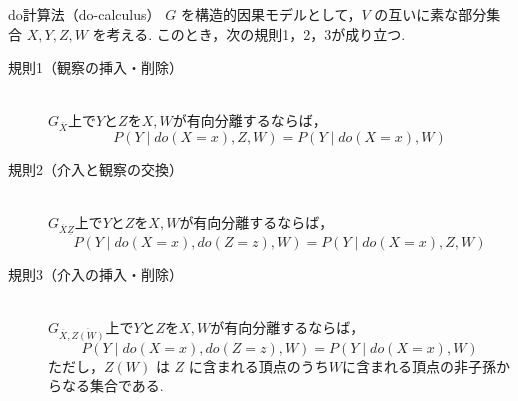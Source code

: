 \documentclass[uplatex, dvipdfmx]{jsarticle}
\begin{document}
\begin{thm}{do計算法（do-calculus）}
  $G$ を構造的因果モデルとして，$V$ の互いに素な部分集合 $X, Y, Z, W$ を考える.
  このとき，次の規則1，2，3が成り立つ.

  \begin{description}
    \item[規則1（観察の挿入・削除）] \hfill \\
      $G_{\overline{X}}$上で$Y$と$Z$を${X,W}$が有向分離するならば，
      \begin{equation}
        P(Y \mid do(X=x), Z, W) = P(Y \mid do(X=x), W)
      \end{equation}

    \item[規則2（介入と観察の交換）] \hfill \\
      $G_{\overline{X}\underline{Z}}$上で$Y$と$Z$を${X,W}$が有向分離するならば，
      \begin{equation}
        P(Y \mid do(X=x), do(Z=z), W) = P(Y \mid do(X=x), Z, W)
      \end{equation}

    \item[規則3（介入の挿入・削除）] \hfill \\
      $G_{\overline{X}, \overline{Z(W)}}$上で$Y$と$Z$を${X,W}$が有向分離するならば，
      \begin{equation}
        P(Y \mid do(X=x), do(Z=z), W) = P(Y \mid do(X=x), W)
      \end{equation}
      ただし，$Z(W)$ は $Z$ に含まれる頂点のうち$W$に含まれる頂点の非子孫からなる集合である.
  \end{description}
\end{thm}
\end{document}
